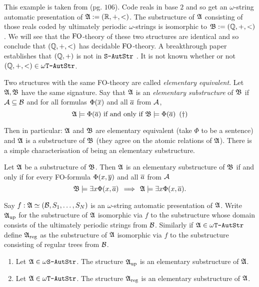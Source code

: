 \begin{example}
This example is taken from \cite{Dauc93} (pg. $106$). Code reals in base $2$ and so get an $\omega$-string automatic presentation of  $\mathfrak{A} := (\mathbb{R},+,<)$. The substructure of $\mathfrak{A}$ consisting of those reals coded by ultimately periodic $\omega$-strings is isomorphic to $\mathfrak{B} := (\mathbb{Q},+,<)$. We will see that the $\mbox{\rm FO}$-theory of these two structures are  identical and so conclude that $(\mathbb{Q},+,<)$ has decidable $\mbox{\rm FO}$-theory. A breakthrough paper establishes that $(\mathbb{Q},+)$ is not in $\mbox{\tt S-AutStr}$ \cite{Tsan11}. 
It is not known whether or not $(\mathbb{Q},+,<) \in \mbox{\tt $\omega$T-AutStr}$. 
\end{example} 

Two structures with the same FO-theory are called {\em elementary equivalent}. Let $\mathfrak{A},\mathfrak{B}$ have the same signature. 
Say that $\mathfrak{A}$ is an {\em elementary substructure} of $\mathfrak{B}$ if
${\mathcal A} \subseteq {\mathcal B}$ and for all formulas $\Phi(\mbox{$\overline {x}$})$ and all $\mbox{$\overline {a}$}$ from ${\mathcal A}$,
\[
\mathfrak{A} \models \Phi(\mbox{$\overline {a}$}) \mbox{ if and only if } \mathfrak{B} \models \Phi(\mbox{$\overline {a}$}) \hspace{5pt} (\dagger)
\]

Then in particular: $\mathfrak{A}$ and $\mathfrak{B}$ are elementary equivalent (take $\Phi$ to be a sentence) 
and $\mathfrak{A}$ is a substructure of $\mathfrak{B}$ (they agree on the atomic relations of $\mathfrak{A}$).
There is a simple characterisation of being an elementary substructure.

\begin{lemma}
Let $\mathfrak{A}$ be a substructure of $\mathfrak{B}$.
Then $\mathfrak{A}$ is an elementary substructure of $\mathfrak{B}$ if and only if  for every FO-formula $\Phi(x,\mbox{$\overline {y}$})$ and all $\mbox{$\overline {a}$}$ from ${\mathcal A}$
\[
\mathfrak{B} \models \exists x \Phi(x,\mbox{$\overline {a}$}) \,  \implies\,  \mathfrak{A} \models \exists x \Phi(x,\mbox{$\overline {a}$}).
\]
\end{lemma}

Say $f:\mathfrak{A} \simeq ({\mathcal B},S_1,\dots,S_N)$ is an $\omega$-string automatic presentation of $\mathfrak{A}$. %
Write $\mathfrak{A}_{\rm{up}}$ for the substructure of $\mathfrak{A}$ isomorphic via $f$ to the substructure whose domain consists of the ultimately periodic strings from ${\mathcal B}$.
Similarly if $\mathfrak{A} \in \mbox{\tt $\omega$T-AutStr}$ define $\mathfrak{A}_{\rm{reg}}$ as the substructure of $\mathfrak{A}$ isomorphic via $f$ to the substructure consisting of regular trees from ${\mathcal B}$.

\begin{proposition} \cite{BKRu08,HKMN08}
\begin{enumerate}
\item Let $\mathfrak{A} \in \mbox{\tt $\omega$S-AutStr}$. The structure $\mathfrak{A}_{\rm{up}}$ is an elementary substructure of $\mathfrak{A}$.
\item Let $\mathfrak{A} \in \mbox{\tt $\omega$T-AutStr}$. The structure $\mathfrak{A}_{\rm{reg}}$ is an elementary substructure of $\mathfrak{A}$.
\end{enumerate}
\end{proposition}

